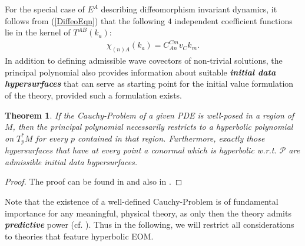 \documentclass[%
preprint,
titlepage,
nofootinbib,
amsmath,amssymb,
showkeys,
aps,
prd,
floatfix,
]{revtex4-2}
\newtheorem{theorem}{Theorem}
\begin{document}
For the special case of $E^A$ describing diffeomorphism invariant dynamics, it follows from (\ref{DiffeoEqn}) that the following $4$ independent coefficient functions lie in the kernel  of $T^{AB}(k_a)$: 
\begin{align}
   \chi_{(n)A}(k_a) =  C_{An}^{Cm}v_Ck_m.
\end{align}
In addition to defining admissible wave covectors of non-trivial solutions, the principal polynomial also provides information about suitable \textit{\textbf{initial data hypersurfaces}} that can serve as starting point for the initial value formulation of the theory, provided such a formulation exists.
\begin{theorem}
If the Cauchy-Problem of a given PDE is well-posed in a region of $M$, then the principal polynomial necessarily restricts to a hyperbolic polynomial on $T_p^{\ast}M$ for every $p$ contained in that region. Furthermore, exactly those hypersurfaces that have at every point a conormal which is hyperbolic w.r.t. $\mathcal{P}$ are admissible initial data hypersurfaces.
\end{theorem}
\begin{proof}
The proof can be found in \cite{Hormander1977} and also in \cite{Ivrii_1974}.
\end{proof}
Note that the existence of a well-defined Cauchy-Problem is of fundamental importance for any meaningful, physical theory, as only then the theory admits \textit{\textbf{predictive}} power (cf. \cite{Rivera}).  Thus in the following, we will restrict all considerations to theories that feature hyperbolic EOM.
\end{document}
